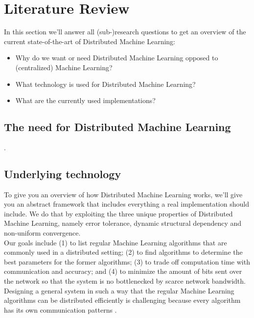 \section{Literature Review}
In this section we'll answer all (sub-)research questions to get an overview of the current state-of-the-art of Distributed Machine Learning:
\begin{itemize}
	\item Why do we want or need Distributed Machine Learning opposed to (centralized) Machine Learning?
	\item What technology is used for Distributed Machine Learning?
	\item What are the currently used implementations?
\end{itemize}

\subsection{The need for Distributed Machine Learning}
.









\subsection{Underlying technology}
To give you an overview of how Distributed Machine Learning works, we'll give you an abstract framework that includes everything a real implementation should include. We do that by exploiting the three unique properties of Distributed Machine Learning, namely error tolerance, dynamic structural dependency and non-uniform convergence.\cite{Xing16}\\
Our goals include (1) to list regular Machine Learning algorithms that are commonly used in a distributed setting; (2) to find algorithms to determine the best parameters for the former algorithms; (3) to trade off computation time with communication and accuracy; and (4) to minimize the amount of bits sent over the network so that the system is no bottlenecked by scarce network bandwidth.\\
Designing a general system in such a way that the regular Machine Learning algorithms can be distributed efficiently is challenging because every algorithm has its own communication patterns \cite{Jia14}\cite{Newman09}\cite{Rich13}\cite{Smola10}\cite{Takac13}\cite{Tsi12}.

